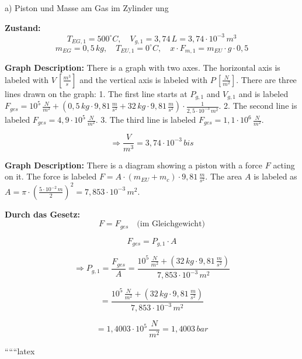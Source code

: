 a) Piston und Masse am Gas im Zylinder ung

\textbf{Zustand:}
\[
T_{EG,1} = 500^\circ C, \quad V_{g,1} = 3,74 \, L = 3,74 \cdot 10^{-3} \, m^3
\]
\[
m_{EG} = 0,5 \, kg, \quad T_{EU,1} = 0^\circ C, \quad x \cdot F_{m,1} = m_{EU} \cdot g \cdot 0,5
\]

\textbf{Graph Description:}
There is a graph with two axes. The horizontal axis is labeled with $V \, \left[\frac{m^3}{s}\right]$ and the vertical axis is labeled with $P \, \left[\frac{N}{m^2}\right]$. There are three lines drawn on the graph:
1. The first line starts at $P_{g,1}$ and $V_{g,1}$ and is labeled $F_{ges} = 10^5 \, \frac{N}{m^2} + \left(0,5 \, kg \cdot 9,81 \, \frac{m}{s^2} + 32 \, kg \cdot 9,81 \, \frac{m}{s^2}\right) \cdot \frac{1}{2,5 \cdot 10^{-3} \, m^2}$.
2. The second line is labeled $F_{ges} = 4,9 \cdot 10^5 \, \frac{N}{m^2}$.
3. The third line is labeled $F_{ges} = 1,1 \cdot 10^6 \, \frac{N}{m^2}$.

\[
\Rightarrow \frac{V}{m^3} = 3,74 \cdot 10^{-3} \, bis
\]

\textbf{Graph Description:}
There is a diagram showing a piston with a force $F$ acting on it. The force is labeled $F = A \cdot \left(m_{EU} + m_{c}\right) \cdot 9,81 \, \frac{m}{s^2}$. The area $A$ is labeled as $A = \pi \cdot \left(\frac{5 \cdot 10^{-2} \, m}{2}\right)^2 = 7,853 \cdot 10^{-3} \, m^2$.

\textbf{Durch das Gesetz:}
\[
F = F_{ges} \quad \text{(im Gleichgewicht)}
\]

\[
F_{ges} = P_{g,1} \cdot A
\]

\[
\Rightarrow P_{g,1} = \frac{F_{ges}}{A} = \frac{10^5 \, \frac{N}{m^2} + \left(32 \, kg \cdot 9,81 \, \frac{m}{s^2}\right)}{7,853 \cdot 10^{-3} \, m^2}
\]

\[
= \frac{10^5 \, \frac{N}{m^2} + \left(32 \, kg \cdot 9,81 \, \frac{m}{s^2}\right)}{7,853 \cdot 10^{-3} \, m^2}
\]

\[
= 1,4003 \cdot 10^5 \, \frac{N}{m^2} = 1,4003 \, bar
\]

``````latex